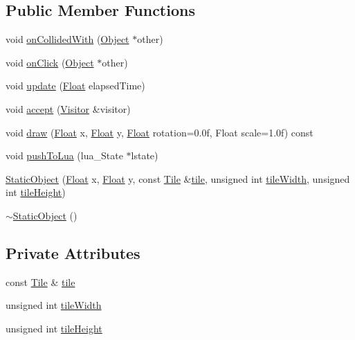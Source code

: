 \subsection*{Public Member Functions}
\begin{DoxyCompactItemize}
\item 
void \hyperlink{classZeta_1_1StaticObject_ad49353bc198af9cf18df5dbadd9b57d1}{on\+Collided\+With} (\hyperlink{classZeta_1_1Object}{Object} $\ast$other)
\item 
void \hyperlink{classZeta_1_1StaticObject_aeeb287b41279c7b10345989f4f737485}{on\+Click} (\hyperlink{classZeta_1_1Object}{Object} $\ast$other)
\item 
void \hyperlink{classZeta_1_1StaticObject_a329b8627e8fb9e8fd73952d11e5f6ed8}{update} (\hyperlink{namespaceZeta_a1e0a1265f9b3bd3075fb0fabd39088ba}{Float} elapsed\+Time)
\item 
void \hyperlink{classZeta_1_1StaticObject_aa0f0de22fd6d22d3fcc06ddcc8f83c99}{accept} (\hyperlink{classZeta_1_1Visitor}{Visitor} \&visitor)
\item 
void \hyperlink{classZeta_1_1StaticObject_a62f25c386ff3b715e30ef5d4f5834805}{draw} (\hyperlink{namespaceZeta_a1e0a1265f9b3bd3075fb0fabd39088ba}{Float} x, \hyperlink{namespaceZeta_a1e0a1265f9b3bd3075fb0fabd39088ba}{Float} y, \hyperlink{namespaceZeta_a1e0a1265f9b3bd3075fb0fabd39088ba}{Float} rotation=0.\+0f, Float scale=1.\+0f) const 
\item 
void \hyperlink{classZeta_1_1StaticObject_a9715902c42dc00103e894e9c5c4a0770}{push\+To\+Lua} (lua\+\_\+\+State $\ast$lstate)
\item 
\hyperlink{classZeta_1_1StaticObject_ade9aab8ef74300cc18d67ea66bd5a8c4}{Static\+Object} (\hyperlink{namespaceZeta_a1e0a1265f9b3bd3075fb0fabd39088ba}{Float} x, \hyperlink{namespaceZeta_a1e0a1265f9b3bd3075fb0fabd39088ba}{Float} y, const \hyperlink{classZeta_1_1Tile}{Tile} \&\hyperlink{classZeta_1_1StaticObject_aae62a6e0faf04194212028767dd96671}{tile}, unsigned int \hyperlink{classZeta_1_1StaticObject_a4d6836b08c51b2807558c39ddc598b33}{tile\+Width}, unsigned int \hyperlink{classZeta_1_1StaticObject_a1cb176fcfe2074edffcaedff80f7fd16}{tile\+Height})
\item 
\hyperlink{classZeta_1_1StaticObject_a82765e6553b1b587a6b835ff24001ea3}{$\sim$\+Static\+Object} ()
\end{DoxyCompactItemize}
\subsection*{Private Attributes}
\begin{DoxyCompactItemize}
\item 
const \hyperlink{classZeta_1_1Tile}{Tile} \& \hyperlink{classZeta_1_1StaticObject_aae62a6e0faf04194212028767dd96671}{tile}
\item 
unsigned int \hyperlink{classZeta_1_1StaticObject_a4d6836b08c51b2807558c39ddc598b33}{tile\+Width}
\item 
unsigned int \hyperlink{classZeta_1_1StaticObject_a1cb176fcfe2074edffcaedff80f7fd16}{tile\+Height}
\end{DoxyCompactItemize}
